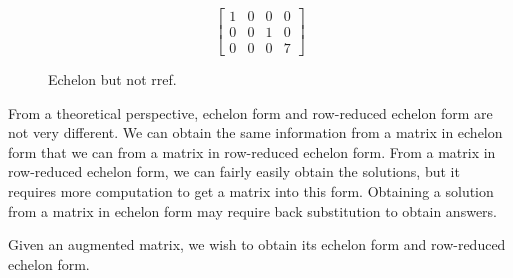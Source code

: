 \documentclass[11pt]{article}
\begin{document}
\begin{figure}
\centering
$$\begin{bmatrix}
1 & 0 & 0 & 0
\\
0 & 0 & 1 & 0
\\
0 & 0 & 0 & 7
\end{bmatrix}$$
\caption{Echelon but not rref.}
\end{figure}

From a theoretical perspective, echelon form and row-reduced echelon form are not very different. We can obtain the same information from a matrix in echelon form that we can from a matrix in row-reduced echelon form. From a matrix in row-reduced echelon form, we can fairly easily obtain the solutions, but it requires more computation to get a matrix into this form. Obtaining a solution from a matrix in echelon form may require back substitution to obtain answers.

Given an augmented matrix, we wish to obtain its echelon form and row-reduced echelon form.
\end{document}
